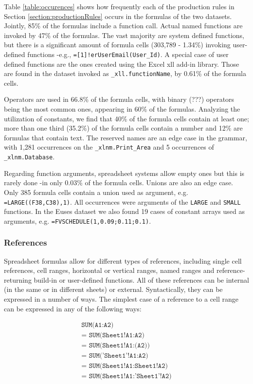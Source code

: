 \documentclass[conference]{IEEEtran}
\begin{document}
Table \ref{table:occurences} shows how frequently each of the production rules in Section \ref{section:productionRules} occurs in the formulas of the two datasets. Jointly, 85\% of the formulas include a function call. Actual named functions are invoked by 47\% of the formulas. The vast majority are system defined functions, but there is a significant amount of formula cells (303,789 - 1.34\%) invoking user-defined functions -e.g., \texttt{=[1]!erUserEmail(User_Id)}. A special case of user defined functions are the ones created using the Excel xll add-in library. Those are found in the dataset invoked as \texttt{_xll.functionName}, by 0.61\% of the formula cells.

Operators are used in 66.8\% of the formula cells, with binary (???) operators being the most common ones, appearing in 60\% of the formulas. Analyzing the utilization of constants, we find that 40\% of the formula cells contain at least one; more than one third (35.2\%) of the formula cells contain a number and 12\% are formulas that contain text. The reserved names are an edge case in the grammar, with 1,281 occurrences on the \texttt{_xlnm.Print_Area} and 5 occurrences of  \texttt{_xlnm.Database}.

Regarding function arguments, spreadsheet systems allow empty ones but this is rarely done -in only 0.03\% of the formula cells. Unions are also an edge case. Only 385 formula cells contain a union used as argument, e.g. \texttt{=LARGE((F38,C38),1)}. All occurrences were arguments of the \texttt{LARGE} and \texttt{SMALL} functions. In the Euses dataset we also found 19 cases of constant arrays used as arguments, e.g. \texttt{=FVSCHEDULE(1,{0.09;0.11;0.1})}.

\subsubsection{References}

Spreadsheet formulas allow for different types of references, including single cell references, cell ranges, horizontal or vertical ranges, named ranges and reference-returning build-in or user-defined functions. All of these references can be internal (in the same or in different sheets) or external. Syntactically, they can be expressed in a number of ways. The simplest case of a reference to a cell range can be expressed in any of the following ways:

\begin{eqnarray*}
	\texttt{SUM(A1:A2)} \\ 
	\texttt{= SUM(Sheet1!A1:A2)} \\
	\texttt{= SUM(Sheet1!A1:(A2))} \\
	\texttt{= SUM('Sheet1'!A1:A2)} \\
	\texttt{= SUM(Sheet1!A1:Sheet1!A2)} \\
	\texttt{= SUM(Sheet1!A1:'Sheet1'!A2)} \\
\end{eqnarray*}
\end{document}
